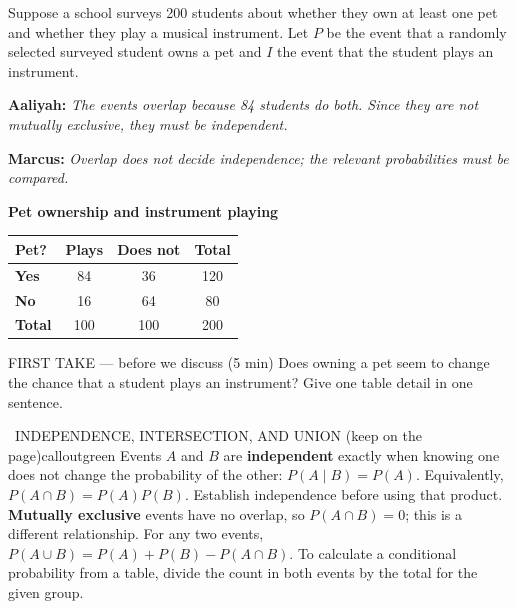 \documentclass[11pt]{article}
\begin{document}


Suppose a school surveys 200 students about whether they own at least one pet and whether they play a musical instrument. Let $P$ be the event that a randomly selected surveyed student owns a pet and $I$ the event that the student plays an instrument.\par\smallskip \textbf{Aaliyah:} \emph{The events overlap because 84 students do both. Since they are not mutually exclusive, they must be independent.}\par \textbf{Marcus:} \emph{Overlap does not decide independence; the relevant probabilities must be compared.}\par
\begin{center}
\textbf{Pet ownership and instrument playing}\par\smallskip
\begin{tabular}{|l|c|c|c|}
\hline
\textbf{Pet?} & \textbf{Plays} & \textbf{Does not} & \textbf{Total} \\ \hline
\textbf{Yes} & 84 & 36 & 120 \\ \hline
\textbf{No} & 16 & 64 & 80 \\ \hline
\textbf{Total} & 100 & 100 & 200 \\ \hline
\end{tabular}
\end{center}
\begin{firsttakebox}{FIRST TAKE --- before we discuss (5 min)}
Does owning a pet seem to change the chance that a student plays an instrument? Give one table detail in one sentence.
\workspace{0.9in}
\end{firsttakebox}

\begin{callout}{\IconBook\ INDEPENDENCE, INTERSECTION, AND UNION (keep on the page)}{calloutgreen}
Events $A$ and $B$ are \textbf{independent} exactly when knowing one does not change the probability of the other:
$P(A\mid B)=P(A)$. Equivalently, $P(A\cap B)=P(A)P(B)$. Establish independence before using that product.
\textbf{Mutually exclusive} events have no overlap, so $P(A\cap B)=0$; this is a different relationship.
For any two events, $P(A\cup B)=P(A)+P(B)-P(A\cap B)$. To calculate a conditional probability from a table, divide the count in both events by the total for the given group.
\end{callout}
\end{document}
